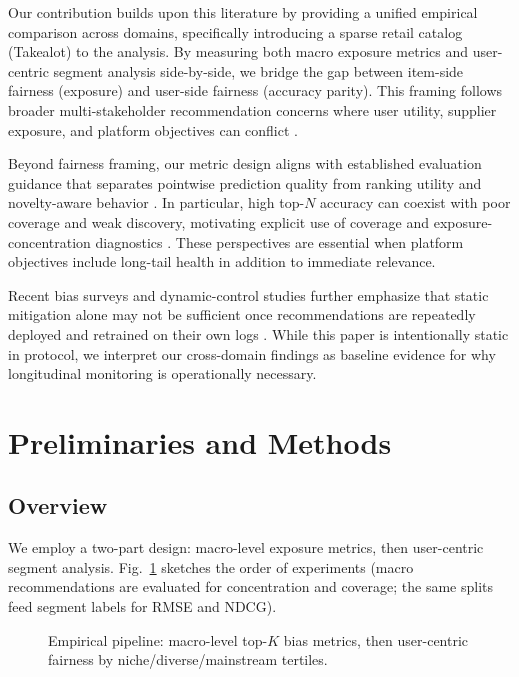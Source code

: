 \documentclass[conference]{IEEEtran}
\begin{document}
Our contribution builds upon this literature by providing a unified empirical comparison across domains, specifically introducing a sparse retail catalog (Takealot) to the analysis. By measuring both macro exposure metrics and user-centric segment analysis side-by-side, we bridge the gap between item-side fairness (exposure) and user-side fairness (accuracy parity). This framing follows broader multi-stakeholder recommendation concerns where user utility, supplier exposure, and platform objectives can conflict \cite{abdollahpouri2020multistakeholder}.

Beyond fairness framing, our metric design aligns with established evaluation guidance that separates pointwise prediction quality from ranking utility and novelty-aware behavior \cite{gunawardana2009evaluation,jarvelin2002cumulated,vargas2011novelty}. In particular, high top-$N$ accuracy can coexist with poor coverage and weak discovery, motivating explicit use of coverage and exposure-concentration diagnostics \cite{ge2010beyond,cremonesi2010performance}. These perspectives are essential when platform objectives include long-tail health in addition to immediate relevance.

Recent bias surveys and dynamic-control studies further emphasize that static mitigation alone may not be sufficient once recommendations are repeatedly deployed and retrained on their own logs \cite{chen2023bias,morik2020controlling,sun2019debiasing}. While this paper is intentionally static in protocol, we interpret our cross-domain findings as baseline evidence for why longitudinal monitoring is operationally necessary.

\section{Preliminaries and Methods}
\label{sec:methods}

\subsection{Overview}

We employ a two-part design: macro-level exposure metrics, then user-centric segment analysis. Fig.~\ref{fig:pipeline} sketches the order of experiments (macro recommendations are evaluated for concentration and coverage; the same splits feed segment labels for RMSE and NDCG).

\begin{figure}[!t]
  \centering
  \caption{Empirical pipeline: macro-level top-$K$ bias metrics, then user-centric fairness by niche/diverse/mainstream tertiles.}
  \label{fig:pipeline}
\end{figure}
\end{document}
